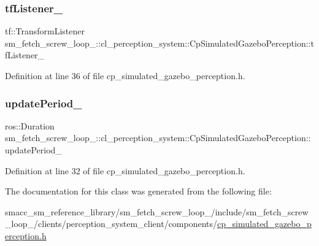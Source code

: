 \subsubsection{\texorpdfstring{tf\+Listener\+\_\+}{tfListener\_}}
{\footnotesize\ttfamily tf\+::\+Transform\+Listener sm\+\_\+fetch\+\_\+screw\+\_\+loop\+\_\+::cl\+\_\+perception\+\_\+system\+::\+Cp\+Simulated\+Gazebo\+Perception\+::tf\+Listener\+\_\+\hspace{0.3cm}{\ttfamily [private]}}



Definition at line 36 of file cp\+\_\+simulated\+\_\+gazebo\+\_\+perception.\+h.

\mbox{\label{classsm__fetch__screw__loop__1_1_1cl__perception__system_1_1CpSimulatedGazeboPerception_a27e862c79209a76a3966c73d6a63083f}} 
\subsubsection{\texorpdfstring{update\+Period\+\_\+}{updatePeriod\_}}
{\footnotesize\ttfamily ros\+::\+Duration sm\+\_\+fetch\+\_\+screw\+\_\+loop\+\_\+::cl\+\_\+perception\+\_\+system\+::\+Cp\+Simulated\+Gazebo\+Perception\+::update\+Period\+\_\+\hspace{0.3cm}{\ttfamily [private]}}



Definition at line 32 of file cp\+\_\+simulated\+\_\+gazebo\+\_\+perception.\+h.



The documentation for this class was generated from the following file\+:\begin{DoxyCompactItemize}
\item 
smacc\+\_\+sm\+\_\+reference\+\_\+library/sm\+\_\+fetch\+\_\+screw\+\_\+loop\+\_/include/sm\+\_\+fetch\+\_\+screw\+\_\+loop\+\_/clients/perception\+\_\+system\+\_\+client/components/\hyperlink{sm__fetch__screw__loop__1_2include_2sm__fetch__screw__loop__1_2clients_2perception__system__clie071e67c5e368edaa0c41500876620cab}{cp\+\_\+simulated\+\_\+gazebo\+\_\+perception.\+h}\end{DoxyCompactItemize}
